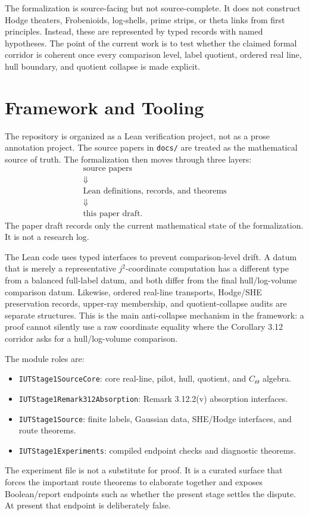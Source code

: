 \documentclass[11pt]{article}
\newcommand{\Lean}{Lean}
\theoremstyle{plain}
\theoremstyle{definition}
\theoremstyle{remark}
\begin{document}
The formalization is source-facing but not source-complete.  It does not
construct Hodge theaters, Frobenioids, log-shells, prime strips, or theta links
from first principles.  Instead, these are represented by typed records with
named hypotheses.  The point of the current work is to test whether the
claimed formal corridor is coherent once every comparison level, label
quotient, ordered real line, hull boundary, and quotient collapse is made
explicit.

\section{Framework and Tooling}

The repository is organized as a Lean verification project, not as a prose
annotation project.  The source papers in \texttt{docs/} are treated as the
mathematical source of truth.  The formalization then moves through three
layers:
\[
\begin{array}{c}
\text{source papers}\\
\Downarrow\\
\text{\Lean{} definitions, records, and theorems}\\
\Downarrow\\
\text{this paper draft}.
\end{array}
\]
The paper draft records only the current mathematical state of the
formalization.  It is not a research log.

The Lean code uses typed interfaces to prevent comparison-level drift.  A datum
that is merely a representative \(j^2\)-coordinate computation has a different
type from a balanced full-label datum, and both differ from the final
hull/log-volume comparison datum.  Likewise, ordered real-line transports,
Hodge/SHE preservation records, upper-ray membership, and quotient-collapse
audits are separate structures.  This is the main anti-collapse mechanism in
the framework: a proof cannot silently use a raw coordinate equality where the
Corollary 3.12 corridor asks for a hull/log-volume comparison.

The module roles are:
\begin{itemize}
\item \texttt{IUTStage1SourceCore}: core real-line, pilot, hull, quotient, and
  \(C_\Theta\) algebra.
\item \texttt{IUTStage1Remark312Absorption}: Remark 3.12.2(v) absorption
  interfaces.
\item \texttt{IUTStage1Source}: finite labels, Gaussian data, SHE/Hodge
  interfaces, and route theorems.
\item \texttt{IUTStage1Experiments}: compiled endpoint checks and diagnostic
  theorems.
\end{itemize}
The experiment file is not a substitute for proof.  It is a curated surface
that forces the important route theorems to elaborate together and exposes
Boolean/report endpoints such as whether the present stage settles the dispute.
At present that endpoint is deliberately false.
\end{document}
